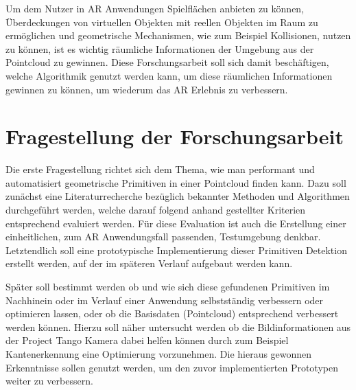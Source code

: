 Um dem Nutzer in AR Anwendungen Spielflächen anbieten zu können, Überdeckungen von virtuellen Objekten mit reellen Objekten im Raum zu ermöglichen und geometrische Mechanismen, wie zum Beispiel Kollisionen, nutzen zu können, ist es wichtig räumliche Informationen der Umgebung aus der Pointcloud zu gewinnen. Diese Forschungsarbeit soll sich damit beschäftigen, welche Algorithmik genutzt werden kann, um diese räumlichen Informationen gewinnen zu können, um wiederum das AR Erlebnis zu verbessern. 

\section{Fragestellung der Forschungsarbeit}

Die erste Fragestellung richtet sich dem Thema, wie man performant und automatisiert geometrische Primitiven in einer Pointcloud finden kann. Dazu soll zunächst eine Literaturrecherche bezüglich bekannter Methoden und Algorithmen durchgeführt werden, welche darauf folgend anhand gestellter Kriterien entsprechend evaluiert werden. Für diese Evaluation ist auch die Erstellung einer einheitlichen, zum AR Anwendungsfall passenden, Testumgebung denkbar. Letztendlich soll eine prototypische Implementierung dieser Primitiven Detektion erstellt werden, auf der im späteren Verlauf aufgebaut werden kann.

Später soll bestimmt werden ob und wie sich diese gefundenen Primitiven im Nachhinein oder im Verlauf einer Anwendung selbstständig verbessern oder optimieren lassen, oder ob die Basisdaten (Pointcloud) entsprechend verbessert werden können. Hierzu soll näher untersucht werden ob die Bildinformationen aus der Project Tango Kamera dabei helfen können durch zum Beispiel Kantenerkennung eine Optimierung vorzunehmen. Die hieraus gewonnen Erkenntnisse sollen genutzt werden, um den zuvor implementierten Prototypen weiter zu verbessern.